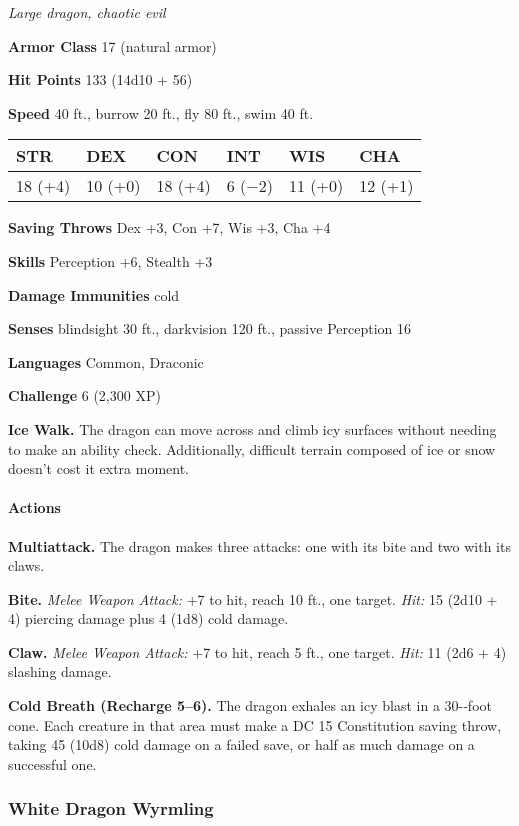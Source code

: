 \documentclass[
]{article}
\begin{document}
\emph{Large dragon, chaotic evil}

\textbf{Armor Class} 17 (natural armor)

\textbf{Hit Points} 133 (14d10 + 56)

\textbf{Speed} 40 ft., burrow 20 ft., fly 80 ft., swim 40 ft.

\begin{longtable}[]{@{}llllll@{}}
\toprule
STR & DEX & CON & INT & WIS & CHA\tabularnewline
\midrule
\endhead
18 (+4) & 10 (+0) & 18 (+4) & 6 (−2) & 11 (+0) & 12 (+1)\tabularnewline
\bottomrule
\end{longtable}

\textbf{Saving Throws} Dex +3, Con +7, Wis +3, Cha +4

\textbf{Skills} Perception +6, Stealth +3

\textbf{Damage Immunities} cold

\textbf{Senses} blindsight 30 ft., darkvision 120 ft., passive
Perception 16

\textbf{Languages} Common, Draconic

\textbf{Challenge} 6 (2,300 XP)

\textbf{Ice Walk.} The dragon can move across and climb icy surfaces
without needing to make an ability check. Additionally, difficult
terrain composed of ice or snow doesn't cost it extra moment.

\hypertarget{actions-41}{%
\paragraph{Actions}\label{actions-41}}

\textbf{Multiattack.} The dragon makes three attacks: one with its bite
and two with its claws.

\textbf{Bite.} \emph{Melee Weapon Attack:} +7 to hit, reach 10 ft., one
target. \emph{Hit:} 15 (2d10 + 4) piercing damage plus 4 (1d8) cold
damage.

\textbf{Claw.} \emph{Melee Weapon Attack:} +7 to hit, reach 5 ft., one
target. \emph{Hit:} 11 (2d6 + 4) slashing damage.

\textbf{Cold Breath (Recharge 5--6).} The dragon exhales an icy blast in
a 30-­‐foot cone. Each creature in that area must make a DC 15
Constitution saving throw, taking 45 (10d8) cold damage on a failed
save, or half as much damage on a successful one.

\hypertarget{white-dragon-wyrmling}{%
\subsubsection{White Dragon Wyrmling}\label{white-dragon-wyrmling}}
\end{document}
